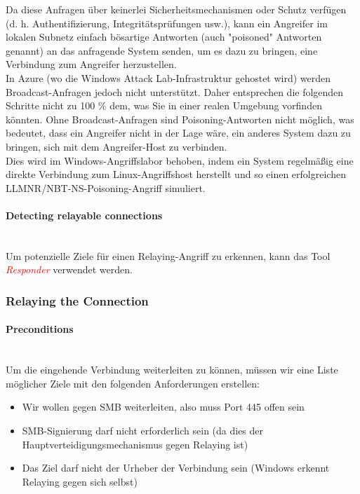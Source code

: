 Da diese Anfragen über keinerlei Sicherheitsmechanismen oder Schutz verfügen (d. h. Authentifizierung, Integritätsprüfungen usw.), kann ein Angreifer im lokalen Subnetz einfach bösartige Antworten (auch "poisoned" Antworten genannt) an das anfragende System senden, um es dazu zu bringen, eine Verbindung zum Angreifer herzustellen.\\

In Azure (wo die Windows Attack Lab-Infrastruktur gehostet wird) werden Broadcast-Anfragen jedoch nicht unterstützt. Daher entsprechen die folgenden Schritte nicht zu 100 \% dem, was Sie in einer realen Umgebung vorfinden könnten. Ohne Broadcast-Anfragen sind Poisoning-Antworten nicht möglich, was bedeutet, dass ein Angreifer nicht in der Lage wäre, ein anderes System dazu zu bringen, sich mit dem Angreifer-Host zu verbinden.\\

Dies wird im Windows-Angriffslabor behoben, indem ein System regelmäßig eine direkte Verbindung zum Linux-Angriffshost herstellt und so einen erfolgreichen LLMNR/NBT-NS-Poisoning-Angriff simuliert.

\paragraph{Detecting relayable connections}\mbox{} \\
Um potenzielle Ziele für einen Relaying-Angriff zu erkennen, kann das Tool \textcolor{red}{\textit{Responder}} verwendet werden.

\subsubsection{Relaying the Connection}

\paragraph{Preconditions}\mbox{} \\

Um die eingehende Verbindung weiterleiten zu können, müssen wir eine Liste möglicher Ziele mit den folgenden Anforderungen erstellen:

\begin{itemize}
    \item Wir wollen gegen SMB weiterleiten, also muss Port 445 offen sein
    \item SMB-Signierung darf nicht erforderlich sein (da dies der Hauptverteidigungsmechanismus gegen Relaying ist)
    \item Das Ziel darf nicht der Urheber der Verbindung sein (Windows erkennt Relaying gegen sich selbst)
\end{itemize}

